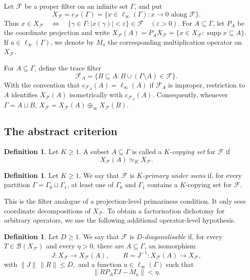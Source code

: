 \documentclass[11pt]{amsart}
\theoremstyle{plain}
\theoremstyle{definition}
\newtheorem{definition}[theorem]{Definition}
\numberwithin{equation}{section}
\renewcommand{\leq}{\leqslant}
\renewcommand{\geq}{\geqslant}
\begin{document}
Let \(\mathcal F\) be a proper filter on an infinite set \(\Gamma\), and put
\[
    X_{\mathcal F}=c_{\mathcal F}(\Gamma)
    =\{x\in \ell_\infty(\Gamma): x\to 0\text{ along }\mathcal F\}.
\]
Thus
\(
    x\in X_{\mathcal F}
    \quad\Longleftrightarrow\quad
    \{\gamma\in\Gamma: |x(\gamma)|<\varepsilon\}\in\mathcal F
    \quad(\varepsilon>0).
\)
For \(A\subseteq\Gamma\), let \(P_A\) be the coordinate projection and write
\(
    X_{\mathcal F}(A)=P_A X_{\mathcal F}
    =\{x\in X_{\mathcal F}: \operatorname{supp}x\subseteq A\}.
\)
If \(a\in\ell_\infty(\Gamma)\), we denote by \(M_a\) the corresponding multiplication operator on \(X_{\mathcal F}\).

For \(A\subseteq\Gamma\), define the trace filter
\[
    \mathcal F_A
    =\{B\subseteq A: B\cup(\Gamma\setminus A)\in\mathcal F\}.
\]
With the convention that \(c_{\mathcal F_A}(A)=\ell_\infty(A)\) if \(\mathcal F_A\) is improper, restriction to \(A\) identifies \(X_{\mathcal F}(A)\) isometrically with \(c_{\mathcal F_A}(A)\).
Consequently, whenever \(\Gamma=A\sqcup B\),
\(
    X_{\mathcal F}=X_{\mathcal F}(A)\oplus_\infty X_{\mathcal F}(B).
\)

\subsection{The abstract criterion}

\begin{definition}\label{def:copying-set}
Let \(K\geq 1\).  A subset \(A\subseteq\Gamma\) is called a
\emph{\(K\)-copying set} for \(\mathcal F\) if
\[
    X_{\mathcal F}(A)\simeq_K X_{\mathcal F}.
\]
\end{definition}

\begin{definition}\label{def:sum-primary-filter}
Let \(K\geq 1\).  We say that \(\mathcal F\) is
\emph{\(K\)-primary under sums} if, for every partition
\(\Gamma=\Gamma_0\sqcup\Gamma_1\), at least one of \(\Gamma_0\) and \(\Gamma_1\) contains a \(K\)-copying set for \(\mathcal F\).
\end{definition}

This is the filter analogue of a projection-level primariness condition.  It only sees coordinate decompositions of \(X_{\mathcal F}\).  To obtain a factorisation dichotomy for arbitrary operators, we use the following additional operator-level hypothesis.

\begin{definition}\label{def:diagonalisable-filter}
Let \(D\geq 1\).  We say that \(\mathcal F\) is
\emph{\(D\)-diagonalisable} if, for every
\(T\in\mathcal B(X_{\mathcal F})\) and every \(\eta>0\), there are
\(A\subseteq\Gamma\), an isomorphism
\[
    J\colon X_{\mathcal F}\longrightarrow X_{\mathcal F}(A),
    \qquad
    R=J^{-1}\colon X_{\mathcal F}(A)\longrightarrow X_{\mathcal F},
\]
with
\(
    \|J\|\,\|R\|\leq D,
\)
and a function \(a\in\ell_\infty(\Gamma)\) such that
\[
    \|R P_A T J-M_a\|<\eta .
\]
\end{definition}
\end{document}
